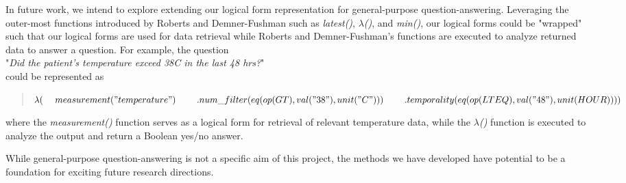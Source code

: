 \documentclass[../main.tex]{subfiles}
\begin{document}
In future work, we intend to explore extending our logical form representation for general-purpose question-answering. Leveraging the outer-most functions introduced by Roberts and Demner-Fushman such as \textit{latest()}, $\lambda$\textit{()}, and \textit{min()}, our logical forms could be "wrapped" such that our logical forms are used for data retrieval while Roberts and Demner-Fushman's functions are executed to analyze returned data to answer a question. For example, the question \\

"\textit{Did the patient’s temperature exceed 38C in the last 48 hrs?}" \\

\noindent could be represented as

\begin{quote}
$\lambda( \\
    \mathrm{\ \ \ \ }measurement("temperature") \\
    \mathrm{\ \ \ \ \ \ \ }.num\_filter(eq(op(GT), val("38"), unit("C")))\\
    \mathrm{\ \ \ \ \ \ \ }.temporality(eq(op(LTEQ), val("48"), unit(HOUR))) \\
)$
\end{quote}

\noindent where the \textit{measurement()} function serves as a logical form for retrieval of relevant temperature data, while the $\lambda$\textit{()} function is executed to analyze the output and return a Boolean yes/no answer.

While general-purpose question-answering is not a specific aim of this project, the methods we have developed have potential to be a foundation for exciting future research directions. 
\end{document}
